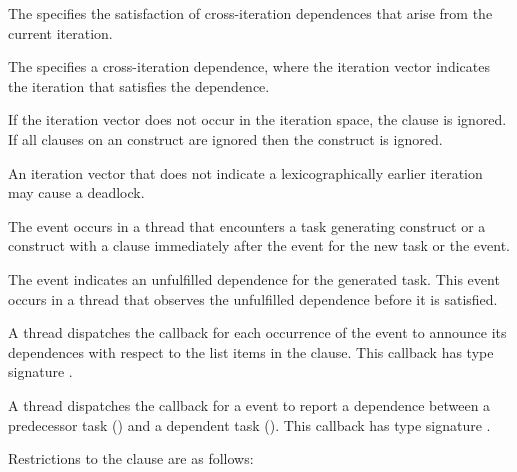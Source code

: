 The   specifies the satisfaction of
cross-iteration dependences that arise from the current iteration.

The   specifies a cross-iteration dependence,
where the iteration vector  indicates the iteration that satisfies
the dependence.

If the iteration vector  does not occur in the iteration space,
the  clause is ignored.  If all  clauses on an
 construct are ignored then the construct is ignored.

\begin{note}
An iteration vector  that does not indicate a lexicographically 
earlier iteration may cause a deadlock.
\end{note}

\events

The  event occurs in a thread that encounters a
task generating construct or a  construct with a  
clause immediately after the  event for the new task or 
the  event.

The  event indicates an unfulfilled dependence for the 
generated task. This event occurs in a thread that observes the unfulfilled 
dependence before it is satisfied. 

\tools

A thread dispatches the  callback
for each occurrence of the  event to
announce its dependences with respect to the list items in the 
 clause. This callback has type signature
.

A thread dispatches the 
callback for a  event to report a
dependence between a predecessor task  () 
and a dependent task ().  This callback 
has type signature .

\restrictions
Restrictions to the  clause are as follows:

